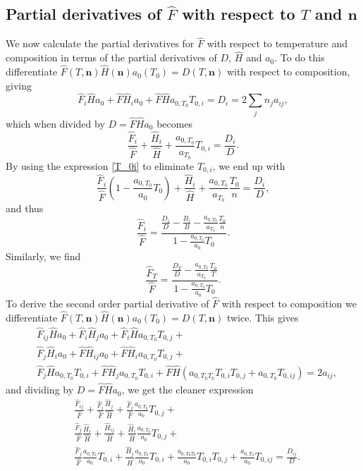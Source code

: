 \documentclass[internal,english]{sintefmemo2012}
\newcommand{\mbn}[0]{\mathbf n}
\newcommand*{\hF}[0]{\hat F}
\newcommand*{\hH}[0]{\hat H}
\newcommand{\lp}{\left(}
\newcommand{\rp}{\right)}
\numberwithin{equation}{section}
\begin{document}
\subsection*{Partial derivatives of $\hF$ with respect to $T$ and
  $\mbn$}
We now calculate the partial derivatives for $\hF$ with respect to
temperature and composition in terms of the partial derivatives of
$D$, $\hH$ and $a_0$. To do this differentiate $\hF(T,\mbn) \hH(\mbn)
a_0(T_0) = D(T,\mbn)$ with respect to composition, giving
$$
\hF_i \hH a_0 + \hF \hH_i a_0 + \hF \hH a_{0,T_0} T_{0,i} = D_i = 2
\sum_j n_j a_{ij},
$$
which when divided by $D = \hF \hH a_0$ becomes
$$
\frac{\hF_i}{\hF} + \frac{\hH_i}{\hH} +
\frac{a_{0,T_0}}{a_{T_0}}T_{0,i}= \frac{D_i}{D}.
$$
By using the expression \eqref{T_0i} to eliminate $T_{0,i}$, we end up
with
$$
\frac{\hF_i}{\hF} \lp 1-\frac{a_{0,T_0}}{a_0} T_0 \rp +
\frac{\hH_i}{\hH} + \frac{a_{0,T_0}}{a_{T_0}}\frac{T_0}{n} =
\frac{D_i}{D},
$$
and thus
\begin{equation}
  \frac{\hF_i}{\hF} = \frac{\frac{D_i}{D} - \frac{B_i}{B} - \frac{a_{0,T_0}}{a_{T_0}}\frac{T_0}{n}}{1-\frac{a_{0,T_0}}{a_0} T_0}.
\end{equation}
Similarly, we find
\begin{equation}
  \frac{\hF_T}{\hF} = \frac{\frac{D_T}{D} - \frac{a_{0,T_0}}{a_{T_0}}\frac{T_0}{T}}{1-\frac{a_{0,T_0}}{a_0} T_0}.
\end{equation}
To derive the second order partial derivative of $\hF$ with respect to
composition we differentiate $\hF(T,\mbn) \hH(\mbn) a_0(T_0) =
D(T,\mbn)$ twice. This gives
\begin{align*}
  &\hF_{ij} \hH a_0 + \hF_i \hH_j a_0 + \hF_i\hH a_{0,T_0} T_{0,j} + \\
  &\hF_{j} \hH_i a_0 + \hF \hH_{ij} a_0 + \hF \hH_i a_{0,T_0} T_{0,j} + \\
  &\hF_j \hH a_{0,T_0} T_{0,i} + \hF \hH_j a_{0,T_0} T_{0,i} + \hF \hH
  (a_{0,T_0T_0} T_{0,i} T_{0,j} + a_{0,T_0} T_{0,ij}) = 2 a_{ij},
\end{align*}
and dividing by $D = \hF \hH a_0$, we get the cleaner expression
\begin{equation}
  \label{hF_ij}
  \begin{aligned}
    &\frac{\hF_{ij}}{\hF} + \frac{\hF_i}{\hF}\frac{\hH_j}{\hH} + \frac{\hF_i}{\hF}\frac{a_{0,T_0}}{a_0} T_{0,j} + \\
    &\frac{\hF_{j}}{\hF} \frac{\hH_i}{\hH} + \frac{\hH_{ij}}{\hH} + \frac{\hH_i}{\hH}\frac{a_{0,T_0}}{a_0} T_{0,j} + \\
    &\frac{\hF_j}{\hF}\frac{a_{0,T_0}}{a_0} T_{0,i} +
    \frac{\hH_j}{\hH}\frac{a_{0,T_0}}{a_0} T_{0,i} +
    \frac{a_{0,T_0T_0}}{a_0} T_{0,i} T_{0,j} + \frac{a_{0,T_0}}{a_0}
    T_{0,ij} = \frac{D_{ij}}{D}.
  \end{aligned}
\end{equation}
\end{document}
